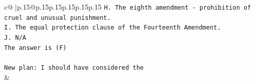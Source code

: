 \documentclass{article}
\begin{document}
{\begin{supertabular}{c@{$\;$}|p{.15\linewidth}@{}p{.15\linewidth}p{.15\linewidth}p{.15\linewidth}p{.15\linewidth}p{.15\linewidth}}
{{{\texttt{H. The eighth amendment {-} prohibition of cruel and unusual punishment.} \\
\texttt{I. The equal protection clause of the Fourteenth Amendment.} \\
\texttt{J. N/A} \\
\texttt{The answer is (F)} \\
\\ 
\texttt{New plan: I should have considered the} \\
            }
        }
    }
    & \\ \\

\end{supertabular}
}
\end{document}
